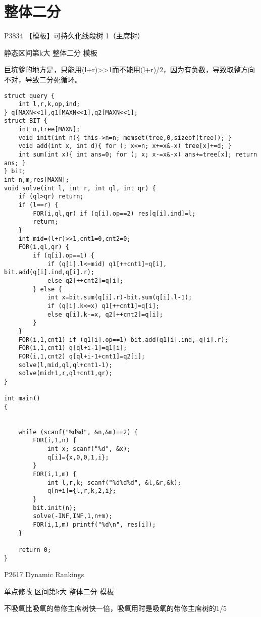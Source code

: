 \section{整体二分}

P3834 【模板】可持久化线段树 1（主席树）

静态区间第k大 整体二分 模板

巨坑爹的地方是，只能用(l+r)>>1而不能用(l+r)/2，因为有负数，导致取整方向不对，导致二分死循环。

\begin{lstlisting}
struct query {
    int l,r,k,op,ind;
} q[MAXN<<1],q1[MAXN<<1],q2[MAXN<<1];
struct BIT {
    int n,tree[MAXN];
    void init(int n){ this->n=n; memset(tree,0,sizeof(tree)); }
    void add(int x, int d){ for (; x<=n; x+=x&-x) tree[x]+=d; }
    int sum(int x){ int ans=0; for (; x; x-=x&-x) ans+=tree[x]; return ans; }
} bit;
int n,m,res[MAXN];
void solve(int l, int r, int ql, int qr) {
    if (ql>qr) return;
    if (l==r) {
        FOR(i,ql,qr) if (q[i].op==2) res[q[i].ind]=l;
        return;
    }
    int mid=(l+r)>>1,cnt1=0,cnt2=0;
    FOR(i,ql,qr) {
        if (q[i].op==1) {
            if (q[i].l<=mid) q1[++cnt1]=q[i], bit.add(q[i].ind,q[i].r);
            else q2[++cnt2]=q[i];
        } else {
            int x=bit.sum(q[i].r)-bit.sum(q[i].l-1);
            if (q[i].k<=x) q1[++cnt1]=q[i];
            else q[i].k-=x, q2[++cnt2]=q[i];
        }
    }
    FOR(i,1,cnt1) if (q1[i].op==1) bit.add(q1[i].ind,-q[i].r);
    FOR(i,1,cnt1) q[ql+i-1]=q1[i];
    FOR(i,1,cnt2) q[ql+i-1+cnt1]=q2[i];
    solve(l,mid,ql,ql+cnt1-1);
    solve(mid+1,r,ql+cnt1,qr);
}

int main()
{


    while (scanf("%d%d", &n,&m)==2) {
        FOR(i,1,n) {
            int x; scanf("%d", &x);
            q[i]={x,0,0,1,i};
        }
        FOR(i,1,m) {
            int l,r,k; scanf("%d%d%d", &l,&r,&k);
            q[n+i]={l,r,k,2,i};
        }
        bit.init(n);
        solve(-INF,INF,1,n+m);
        FOR(i,1,m) printf("%d\n", res[i]);
    }

    return 0;
}
\end{lstlisting}

P2617 Dynamic Rankings

单点修改 区间第k大 整体二分 模板

不吸氧比吸氧的带修主席树快一倍，吸氧用时是吸氧的带修主席树的1/5

